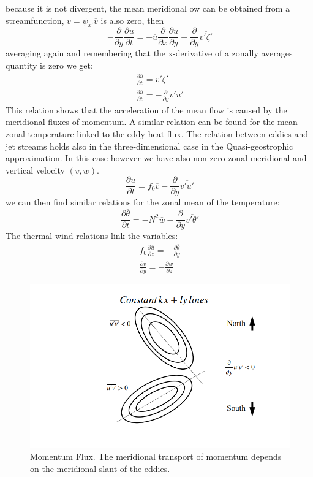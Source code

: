 because it is not divergent, the mean meridional ow can be obtained from a streamfunction, $v=\psi_{x'}\overline{v}$ is also zero, then
$$-\frac{\partial}{\partial y}\frac{\partial\overline{u}}{\partial t}=+\overline{u}\frac{\partial}{\partial x}\frac{\partial\overline{u}}{\partial y}-\frac{\partial}{\partial y}\overline{v'\zeta'}$$
averaging again and remembering that the x-derivative of a zonally averages quantity is zero we get:
\begin{align*}
	\frac{\partial\overline{u}}{\partial t}=\overline{v'\zeta'}\\
	\frac{\partial\overline{u}}{\partial t}=-\frac{\partial}{\partial y}\overline{v'u'}
\end{align*}
This relation shows that the acceleration of the mean flow is caused by the meridional fluxes of momentum. A similar relation can be found for the mean zonal temperature linked to the eddy heat flux. The relation between eddies and jet streams holds also in the three-dimensional case in the Quasi-geostrophic approximation. In this case however we have also non zero
zonal meridional and vertical velocity $(v,w)$.
$$\frac{\partial\overline{u}}{\partial t}=f_0\overline{v}-\frac{\partial}{\partial y}\overline{v'u'}$$
we can then find similar relations for the zonal mean of the temperature:
\begin{equation}\label{eq.zonal mean of temperature}
\frac{\partial\overline{\theta}}{\partial t}=-N^2\overline{w}-\frac{\partial}{\partial y}\overline{v'\theta'}
\end{equation}
The thermal wind relations link the variables:
\begin{align}\label{eq.thermal wind}
f_0\frac{\partial\overline{u}}{\partial z}=-\frac{\partial\overline{\theta}}{\partial y}\\
\frac{\partial\overline{v}}{\partial y}=-\frac{\partial\overline{w}}{\partial z}
\end{align}
\begin{figure}[htp!]
	\centering
	\includegraphics[width=0.5\linewidth]{uploads/Screenshot 2024-11-22 202457.png}
	\caption{Momentum Flux. The meridional transport of momentum depends on the meridional slant of the eddies.}
	\label{fig:enter-label}
\end{figure}

